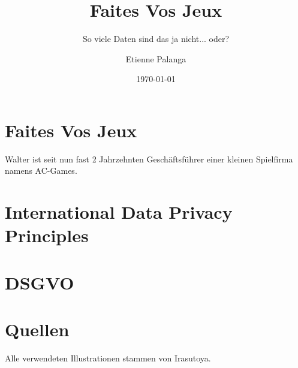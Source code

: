 \documentclass[11pt, a4paper]{scrartcl}
\title{Faites Vos Jeux}
\subtitle{So viele Daten sind das ja nicht... oder?}
\author{Etienne Palanga}
\date{\today}
\begin{document}
\maketitle

\tableofcontents




\section{Faites Vos Jeux}

Walter ist seit nun fast 2 Jahrzehnten Geschäftsführer einer kleinen Spielfirma namens AC-Games.



\section{International Data Privacy Principles}

\section{DSGVO}

\newpage

\section{Quellen}

Alle verwendeten Illustrationen stammen von Irasutoya.\cite{mifune_irasutoya_nodate} 

\nocite{mifune_irasutoya_nodate}

\printbibliography[heading=none]
\end{document}
